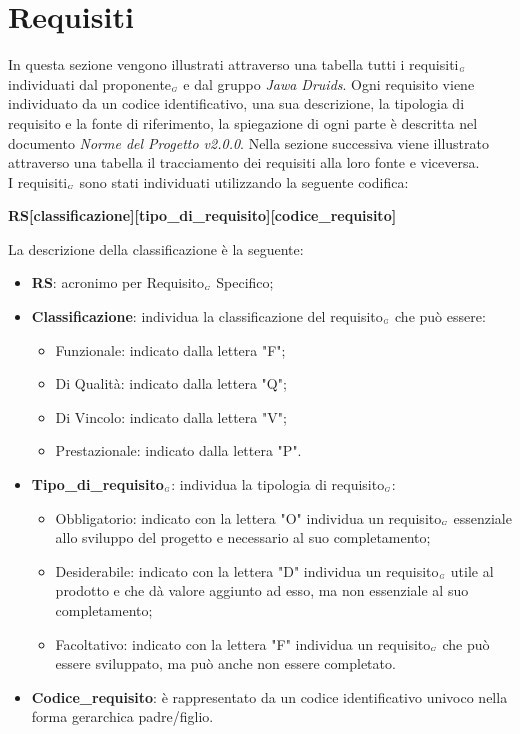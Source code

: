 \chapter{Requisiti}\label{Requisiti}
In questa sezione vengono illustrati attraverso una tabella tutti i requisiti$_{\scaleto{G}{3pt}}$ individuati dal proponente$_{\scaleto{G}{3pt}}$ e dal gruppo \textit{Jawa Druids}. Ogni requisito viene individuato da un codice identificativo, una sua descrizione, la tipologia di requisito e la fonte di riferimento, la spiegazione di ogni parte è descritta nel documento \textit{Norme del Progetto v2.0.0}. Nella sezione successiva viene illustrato attraverso una tabella il tracciamento dei requisiti alla loro fonte e viceversa.\\
I requisiti$_{\scaleto{G}{3pt}}$ sono stati individuati utilizzando la seguente codifica:
\begin{center}
	\textbf{RS[classificazione][tipo\_di\_requisito][codice\_requisito]}
\end{center}
La descrizione della classificazione è la seguente:
\begin{itemize}
	\item \textbf{RS}: acronimo per Requisito$_{\scaleto{G}{3pt}}$ Specifico;
	\item \textbf{Classificazione}: individua la classificazione del requisito$_{\scaleto{G}{3pt}}$ che può essere:
	\begin{itemize}
		\item Funzionale: indicato dalla lettera "F";
		\item Di Qualità: indicato dalla lettera "Q";
		\item Di Vincolo: indicato dalla lettera "V";
		\item Prestazionale: indicato dalla lettera "P".
	\end{itemize}
	\item \textbf{Tipo\_di\_requisito$_{\scaleto{G}{3pt}}$}: individua la tipologia di requisito$_{\scaleto{G}{3pt}}$:
	\begin{itemize}
		\item Obbligatorio: indicato con la lettera "O" individua un requisito$_{\scaleto{G}{3pt}}$ essenziale allo sviluppo del progetto e necessario al suo completamento;
		\item Desiderabile: indicato con la lettera "D" individua un requisito$_{\scaleto{G}{3pt}}$ utile al prodotto e che dà valore aggiunto ad esso, ma non essenziale al suo completamento;
		\item Facoltativo: indicato con la lettera "F" individua un requisito$_{\scaleto{G}{3pt}}$ che può essere sviluppato, ma può anche non essere completato.
	\end{itemize}
	\item \textbf{Codice\_requisito}: è rappresentato da un codice identificativo univoco nella forma gerarchica padre/figlio.
\end{itemize}

